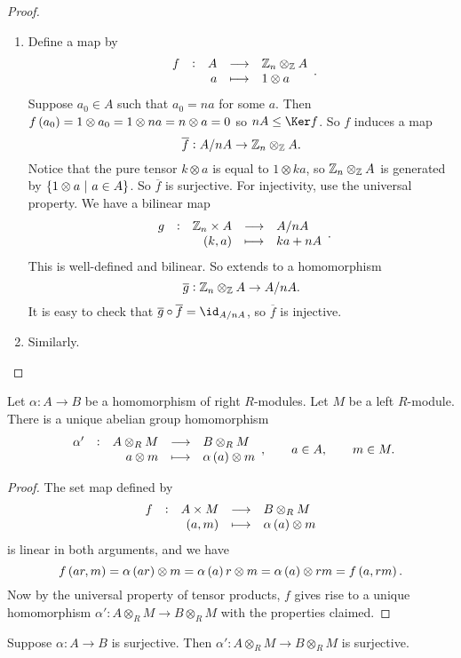 \begin{proof}
\hfill
\begin{enumerate}
\item Define a map by
$$ \function[f]{A}{\ZZ_n \otimes_\ZZ A}{a}{1 \otimes a}. $$
Suppose $ a_0 \in A $ such that $ a_0 = na $ for some $ a $. Then $ f\br{a_0} = 1 \otimes a_0 = 1 \otimes na = n \otimes a = 0 $ so $ nA \le \Ker f $. So $ f $ induces a map
$$ \overline{f} : A / nA \to \mathbb{Z}_n \otimes_{\mathbb{Z}} A. $$
Notice that the pure tensor $ k \otimes a $ is equal to $ 1 \otimes ka $, so $ \mathbb{Z}_n \otimes_{\mathbb{Z}} A $ is generated by $ \cbr{1 \otimes a \st a \in A} $. So $ \overline{f} $ is surjective. For injectivity, use the universal property. We have a bilinear map
$$ \function[g]{\ZZ_n \times A}{A / nA}{\br{k, a}}{ka + nA}. $$
This is well-defined and bilinear. So extends to a homomorphism
$$ \overline{g} : \mathbb{Z}_n \otimes_{\mathbb{Z}} A \to A / nA. $$
It is easy to check that $ \overline{g} \circ \overline{f} = \id_{A / nA} $, so $ \overline{f} $ is injective.
\item Similarly.
\end{enumerate}
\end{proof}

\pagebreak


\begin{proposition}
Let $ \alpha : A \to B $ be a homomorphism of right $ R $-modules. Let $ M $ be a left $ R $-module. There is a unique abelian group homomorphism
$$ \function[\alpha']{A \otimes_R M}{B \otimes_R M}{a \otimes m}{\alpha\br{a} \otimes m}, \qquad a \in A, \qquad m \in M. $$
\end{proposition}

\begin{proof}
The set map defined by
$$ \function[f]{A \times M}{B \otimes_R M}{\br{a, m}}{\alpha\br{a} \otimes m} $$
is linear in both arguments, and we have
$$ f\br{ar, m} = \alpha\br{ar} \otimes m = \alpha\br{a}r \otimes m = \alpha\br{a} \otimes rm = f\br{a, rm}. $$
Now by the universal property of tensor products, $ f $ gives rise to a unique homomorphism $ \alpha' : A \otimes_R M \to B \otimes_R M $ with the properties claimed.
\end{proof}

\begin{proposition}
Suppose $ \alpha : A \to B $ is surjective. Then $ \alpha' : A \otimes_R M \to B \otimes_R M $ is surjective.
\end{proposition}

